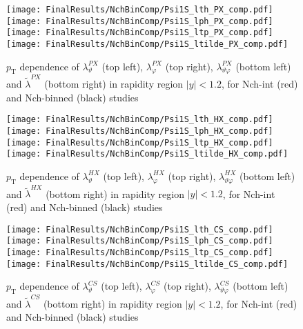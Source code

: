 \documentclass[12pt]{article}
\newcommand{\pT}{p_\mathrm{T}}
\newcommand{\absy}{\left |  y \right |}
\newcommand{\lamthCS}{\lambda^{\scriptscriptstyle CS}_\vartheta}
\newcommand{\lamphCS}{\lambda^{\scriptscriptstyle CS}_\varphi}
\newcommand{\lamthphCS}{\lambda^{\scriptscriptstyle CS}_{\vartheta \varphi}}
\newcommand{\lamtildeCS}{\tilde{\lambda}^{\scriptscriptstyle CS}}
\newcommand{\lamthHX}{\lambda^{\scriptscriptstyle HX}_\vartheta}
\newcommand{\lamphHX}{\lambda^{\scriptscriptstyle HX}_\varphi}
\newcommand{\lamthphHX}{\lambda^{\scriptscriptstyle HX}_{\vartheta \varphi}}
\newcommand{\lamtildeHX}{\tilde{\lambda}^{\scriptscriptstyle HX}}
\newcommand{\lamthPX}{\lambda^{\scriptscriptstyle PX}_\vartheta}
\newcommand{\lamphPX}{\lambda^{\scriptscriptstyle PX}_\varphi}
\newcommand{\lamthphPX}{\lambda^{\scriptscriptstyle PX}_{\vartheta \varphi}}
\newcommand{\lamtildePX}{\tilde{\lambda}^{\scriptscriptstyle PX}}
\begin{document}



\begin{figure}[htbp]
\centering
\texttt{[image: FinalResults/NchBinComp/Psi1S\_lth\_PX\_comp.pdf]}
\texttt{[image: FinalResults/NchBinComp/Psi1S\_lph\_PX\_comp.pdf]}
\texttt{[image: FinalResults/NchBinComp/Psi1S\_ltp\_PX\_comp.pdf]}
\texttt{[image: FinalResults/NchBinComp/Psi1S\_ltilde\_PX\_comp.pdf]}
\caption{$\pT$ dependence of $\lamthPX$
(top left), $\lamphPX$ (top right), $\lamthphPX$ (bottom left) and 
$\lamtildePX$ (bottom right) in rapidity region $\absy<1.2$, for Nch-int (red) and Nch-binned (black) studies }
\end{figure}
\clearpage







\begin{figure}[htbp]
\centering
\texttt{[image: FinalResults/NchBinComp/Psi1S\_lth\_HX\_comp.pdf]}
\texttt{[image: FinalResults/NchBinComp/Psi1S\_lph\_HX\_comp.pdf]}
\texttt{[image: FinalResults/NchBinComp/Psi1S\_ltp\_HX\_comp.pdf]}
\texttt{[image: FinalResults/NchBinComp/Psi1S\_ltilde\_HX\_comp.pdf]}
\caption{$\pT$ dependence of $\lamthHX$
(top left), $\lamphHX$ (top right), $\lamthphHX$ (bottom left) and 
$\lamtildeHX$ (bottom right) in rapidity region $\absy<1.2$, for Nch-int (red) and Nch-binned (black) studies }
\end{figure}
\clearpage






\begin{figure}[htbp]
\centering
\texttt{[image: FinalResults/NchBinComp/Psi1S\_lth\_CS\_comp.pdf]}
\texttt{[image: FinalResults/NchBinComp/Psi1S\_lph\_CS\_comp.pdf]}
\texttt{[image: FinalResults/NchBinComp/Psi1S\_ltp\_CS\_comp.pdf]}
\texttt{[image: FinalResults/NchBinComp/Psi1S\_ltilde\_CS\_comp.pdf]}
\caption{$\pT$ dependence of $\lamthCS$
(top left), $\lamphCS$ (top right), $\lamthphCS$ (bottom left) and 
$\lamtildeCS$ (bottom right) in rapidity region $\absy<1.2$, for Nch-int (red) and Nch-binned (black) studies }
\end{figure}
\clearpage
\end{document}
